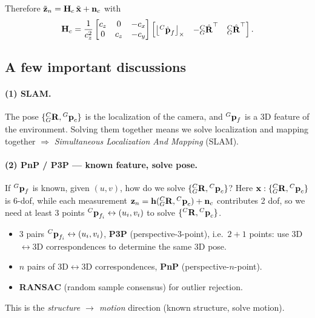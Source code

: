 Therefore $\tilde{\boldsymbol{\mathbf{z}}}_n = \boldsymbol{\mathbf{H}}_c\,\tilde{\boldsymbol{\mathbf{x}}} + \boldsymbol{\mathbf{n}}_c$ with
\begin{align}
\boldsymbol{\mathbf{H}}_c = \frac{1}{c_z^{2}}\begin{bmatrix} c_z & 0 & -c_x \\ 0 & c_z & -c_y \end{bmatrix}
\begin{bmatrix} \left\lfloor{}^{C}\hat{\boldsymbol{\mathbf{p}}}_f\right\rfloor_{\times} & -{}^{C}_{G}\hat{\boldsymbol{\mathbf{R}}}^\top & {}^{C}_{G}\hat{\boldsymbol{\mathbf{R}}}^\top \end{bmatrix}.
\end{align}

\subsection{A few important discussions}

\paragraph{(1) SLAM.} The pose $\{{}^{C}_{G}\boldsymbol{\mathbf{R}},{}^{G}\boldsymbol{\mathbf{p}}_c\}$ is the localization of the camera, and ${}^{G}\boldsymbol{\mathbf{p}}_f$ is a 3D feature of the environment. Solving them together means we solve localization and mapping together $\Rightarrow$ \emph{Simultaneous Localization And Mapping} (SLAM).

\paragraph{(2) PnP / P3P --- known feature, solve pose.} If ${}^{G}\boldsymbol{\mathbf{p}}_f$ is known, given $(u,v)$, how do we solve $\{{}^{C}_{G}\boldsymbol{\mathbf{R}},{}^{C}\boldsymbol{\mathbf{p}}_c\}$? Here $\boldsymbol{\mathbf{x}} : \{{}^{C}_{G}\boldsymbol{\mathbf{R}},{}^{C}\boldsymbol{\mathbf{p}}_c\}$ is 6-dof, while each measurement $\boldsymbol{\mathbf{z}}_n = \boldsymbol{\mathbf{h}}({}^{C}_{G}\boldsymbol{\mathbf{R}},{}^{C}\boldsymbol{\mathbf{p}}_c) + \boldsymbol{\mathbf{n}}_c$ contributes 2 dof, so we need at least 3 points ${}^{C}\boldsymbol{\mathbf{p}}_{f_i} \leftrightarrow (u_i,v_i)$ to solve $\{{}^{C}\boldsymbol{\mathbf{R}},{}^{C}\boldsymbol{\mathbf{p}}_c\}$.
\begin{itemize}[noitemsep,topsep=2pt]
\item 3 pairs ${}^{C}\boldsymbol{\mathbf{p}}_{f_i}\leftrightarrow(u_i,v_i)$, \textbf{P3P} (perspective-3-point), i.e.\ $2{+}1$ points: use 3D$\leftrightarrow$3D correspondences to determine the same 3D pose.
\item $n$ pairs of 3D$\leftrightarrow$3D correspondences, \textbf{PnP} (perspective-$n$-point).
\item \textbf{RANSAC} (random sample consensus) for outlier rejection.
\end{itemize}
This is the \emph{structure $\to$ motion} direction (known structure, solve motion).

